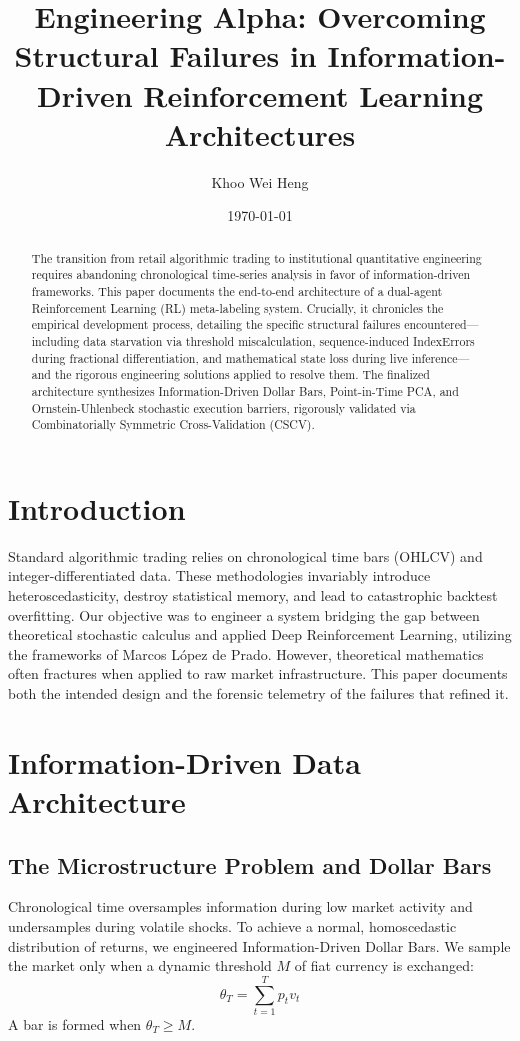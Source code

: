 \documentclass[12pt, a4paper]{article}
\title{\textbf{Engineering Alpha: Overcoming Structural Failures in Information-Driven Reinforcement Learning Architectures}}
\author{Khoo Wei Heng}
\date{\today}
\begin{document}
\maketitle

\begin{abstract}
The transition from retail algorithmic trading to institutional quantitative engineering requires abandoning chronological time-series analysis in favor of information-driven frameworks. This paper documents the end-to-end architecture of a dual-agent Reinforcement Learning (RL) meta-labeling system. Crucially, it chronicles the empirical development process, detailing the specific structural failures encountered—including data starvation via threshold miscalculation, sequence-induced IndexErrors during fractional differentiation, and mathematical state loss during live inference—and the rigorous engineering solutions applied to resolve them. The finalized architecture synthesizes Information-Driven Dollar Bars, Point-in-Time PCA, and Ornstein-Uhlenbeck stochastic execution barriers, rigorously validated via Combinatorially Symmetric Cross-Validation (CSCV).
\end{abstract}

\section{Introduction}
Standard algorithmic trading relies on chronological time bars (OHLCV) and integer-differentiated data. These methodologies invariably introduce heteroscedasticity, destroy statistical memory, and lead to catastrophic backtest overfitting. Our objective was to engineer a system bridging the gap between theoretical stochastic calculus and applied Deep Reinforcement Learning, utilizing the frameworks of Marcos López de Prado. However, theoretical mathematics often fractures when applied to raw market infrastructure. This paper documents both the intended design and the forensic telemetry of the failures that refined it.

\section{Information-Driven Data Architecture}

\subsection{The Microstructure Problem and Dollar Bars}
Chronological time oversamples information during low market activity and undersamples during volatile shocks. To achieve a normal, homoscedastic distribution of returns, we engineered Information-Driven Dollar Bars. We sample the market only when a dynamic threshold $M$ of fiat currency is exchanged:
$$ \theta_T = \sum_{t=1}^{T} p_t v_t $$
A bar is formed when $\theta_T \geq M$. 
\end{document}
